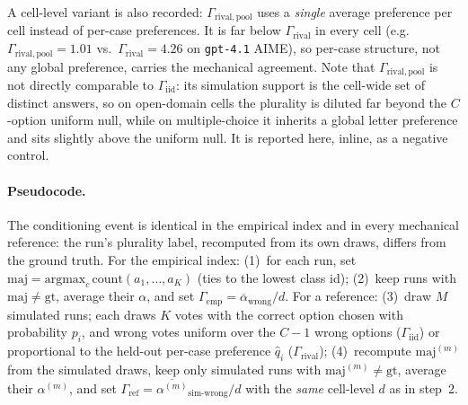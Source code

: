 \documentclass{article}
\newcommand{\agreementIndex}{\Gamma}
\begin{document}
A cell-level variant is also recorded: $\agreementIndex_{\mathrm{rival,pool}}$
uses a \emph{single} average preference per cell instead of per-case
preferences. It is far below $\agreementIndex_{\mathrm{rival}}$ in every cell
(e.g.\ $\agreementIndex_{\mathrm{rival,pool}}=1.01$ vs.\ $\agreementIndex_{\mathrm{rival}}=4.26$
on \texttt{gpt-4.1} AIME), so per-case structure, not any
global preference, carries the mechanical agreement. Note that
$\agreementIndex_{\mathrm{rival,pool}}$ is not directly comparable to
$\agreementIndex_{\mathrm{iid}}$: its simulation support is the cell-wide set of
distinct answers, so on open-domain cells the plurality is diluted far
beyond the $C$-option uniform null, while on multiple-choice it inherits
a global letter preference and sits slightly above the uniform null. It is reported here, inline, as a negative control.

\paragraph{Pseudocode.}
\label{alg:kappa}
The conditioning event is identical in the empirical index and in every
mechanical reference: the run's plurality label, recomputed from its own
draws, differs from the ground truth. For the empirical index:
(1)~for each run, set $\mathrm{maj}=\mathrm{argmax}_c\,
\mathrm{count}(a_1,\dots,a_K)$ (ties to the lowest class id); (2)~keep
runs with $\mathrm{maj}\ne\mathrm{gt}$, average their $\alpha$, and set
$\agreementIndex_{\mathrm{emp}}=\overline{\alpha}_{\text{wrong}}/d$. For a
reference: (3)~draw $M$ simulated runs; each draws $K$ votes with the
correct option chosen with probability $p_i$, and wrong votes uniform
over the $C-1$ wrong options ($\agreementIndex_{\mathrm{iid}}$) or proportional to
the held-out per-case preference $\hat q_i$
($\agreementIndex_{\mathrm{rival}}$); (4)~recompute
$\mathrm{maj}^{(m)}$ from the simulated draws, keep only simulated runs
with $\mathrm{maj}^{(m)}\ne\mathrm{gt}$, average their $\alpha^{(m)}$,
and set $\agreementIndex_{\mathrm{ref}}=\overline{\alpha^{(m)}}_{\text{sim-wrong}}/d$
with the \emph{same} cell-level $d$ as in step~2.
\end{document}
